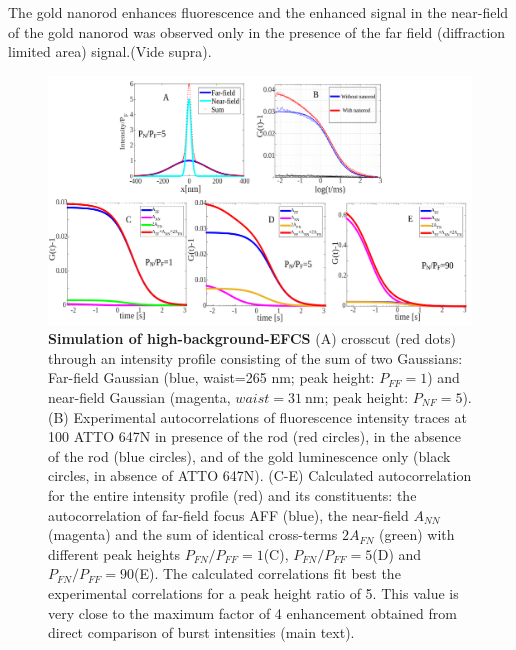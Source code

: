 The gold nanorod enhances fluorescence and the enhanced signal in the near-field of the gold nanorod was observed only in the presence of the far field (diffraction limited area) signal.(Vide supra).
\begin{figure}%
  \centering
  \includegraphics[width=\textwidth]{calc_enhc_corr}
  \makeatletter
  \renewcommand{\fnum@figure}{\figurename~S\thefigure}
  \makeatother{}
  \caption{\textbf{Simulation of high-background-EFCS} (A) crosscut (red dots) through an intensity profile consisting of the sum of two Gaussians: Far-field Gaussian (blue, waist=265 nm; peak height: $P_{FF}=1$) and near-field Gaussian (magenta, $waist=\SI{31}{\nm}$; peak height: $P_{NF}=5$).
  (B) Experimental autocorrelations of fluorescence intensity traces at \SI{100}{\nM} ATTO 647N in presence of the rod (red circles), in the absence of the rod (blue circles), and of the gold luminescence only (black circles, in absence of ATTO 647N).
  (C-E) Calculated autocorrelation for the entire intensity profile (red) and its constituents: the autocorrelation of far-field focus AFF (blue), the near-field $A_{NN}$ (magenta) and the 
  sum of identical cross-terms $2A_{FN}$ (green) with different peak heights $P_{FN}/P_{FF}=1$(C), $P_{FN}/P_{FF}=5$(D) and $P_{FN}/P_{FF}=90$(E).
  The calculated correlations fit best the experimental correlations for a peak height ratio of 5.
  This value is very close to the maximum factor of 4 enhancement obtained from direct comparison of burst intensities (main text).}
  \label{SIfig:calc_enhc_corr}
\end{figure}

